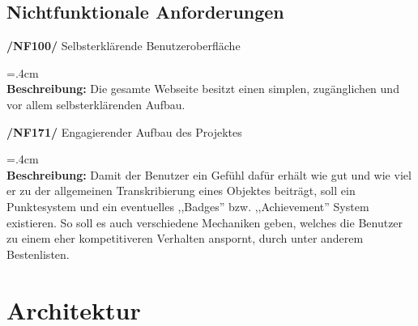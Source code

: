 \documentclass{article}
\newenvironment{funcD}{\vspace{-.6cm}\\\par\begingroup\leftskip=.4cm\noindent\\}{\\\par\endgroup\noindent}
\begin{document}
\subsection{Nichtfunktionale Anforderungen}
\textbf{/NF100/} Selbsterklärende Benutzeroberfläche
\begin{funcD}
    \textbf{Beschreibung:} Die gesamte Webseite besitzt einen simplen, zugänglichen und vor allem selbsterklärenden Aufbau. 
\end{funcD}
\textbf{/NF171/} Engagierender Aufbau des Projektes
\begin{funcD}
    \textbf{Beschreibung:} Damit der Benutzer ein Gefühl dafür erhält wie gut und wie viel er zu der allgemeinen Transkribierung eines Objektes beiträgt, soll ein Punktesystem und ein eventuelles ,,Badges'' bzw. ,,Achievement'' System existieren. So soll es auch verschiedene Mechaniken geben, welches die Benutzer zu einem eher kompetitiveren Verhalten anspornt, durch unter anderem Bestenlisten.
\end{funcD}

\section{Architektur}
\end{document}
